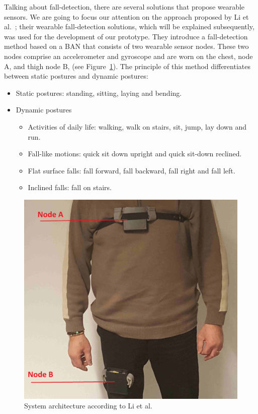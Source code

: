\documentclass[journal]{IEEEtran}
\begin{document}
Talking about fall-detection, there are several solutions that propose wearable sensors.
We are going to focus our attention on the approach proposed by Li et al.~\cite{Li2009}; their wearable fall-detection solutions,
which will be explained subsequently, was used for the development of our prototype. They introduce a fall-detection method based on a BAN that consists 
of two wearable sensor nodes. These two nodes comprise an accelerometer and gyroscope and are worn on the chest, node A, and thigh 
node B, (see Figure~\ref{fig:simulation}). The principle of this method differentiates between static postures and dynamic postures: 

\begin{itemize}
 \item Static postures: standing, sitting, laying and bending.
 \item Dynamic postures
 \begin{itemize}
  \item Activities of daily life: walking, walk on stairs, sit, jump, lay down and run.
  \item Fall-like motions: quick sit down upright and quick sit-down reclined.
  \item Flat surface falls: fall forward, fall backward, fall right and fall left.
  \item Inclined falls: fall on stairs.
 \end{itemize}
\end{itemize}

\begin{figure}[!ht]
  \centering
  \includegraphics[scale=0.15]{img/BasePrototype.png}
  \caption[System architecture]{System architecture according to Li et al.~\cite{Li2009}}
  \label{fig:simulation}
\end{figure}
\end{document}
